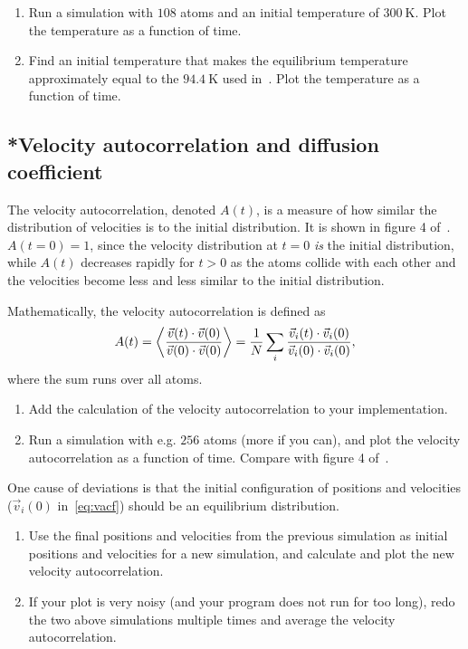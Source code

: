 \documentclass[11pt,english,a4paper]{report}
\begin{document}
\begin{enumerate}[label=\roman*.,resume]
    \item Run a simulation with \(108\) atoms and an initial temperature of \(\SI{300}{\kelvin}\). Plot the temperature as a function of time.
    \item Find an initial temperature that makes the equilibrium temperature approximately equal to the \(\SI{94.4}{\kelvin}\) used in~\cite{Rahman_1964}. Plot the temperature as a function of time.
\end{enumerate}


\subsection{*Velocity autocorrelation and diffusion coefficient}

The velocity autocorrelation, denoted \(A(t)\), is a measure of how
similar the distribution of velocities is to the initial
distribution. It is shown in figure 4
of~\cite{Rahman_1964}. \(A(t=0)=1\), since the velocity distribution
at \(t=0\) \emph{is} the initial distribution, while \(A(t)\)
decreases rapidly for \(t>0\) as the atoms collide with each other and
the velocities become less and less similar to the initial
distribution.

Mathematically, the velocity autocorrelation is defined as
\begin{equation}
    A(t) = \ev{\frac{\vec{v}(t)\cdot\vec{v}(0)}{\vec{v}(0)\cdot\vec{v}(0)}}
         = \frac{1}{N} \sum_i \frac{\vec{v}_i(t)\cdot\vec{v}_i(0)}{\vec{v}_i(0)\cdot\vec{v}_i(0)},\label{eq:vacf}
\end{equation}
where the sum runs over all atoms.

\begin{enumerate}[label=\roman*.]
    \item Add the calculation of the velocity autocorrelation to your implementation.
    \item Run a simulation with e.g. \(256\) atoms (more if you can), and plot the velocity autocorrelation as a function of time. Compare with figure 4 of~\cite{Rahman_1964}.
\end{enumerate}

One cause of deviations is that the initial configuration of positions
and velocities (\(\vec{v}_i(0)\) in~\vref{eq:vacf}) should be an
equilibrium distribution.

\begin{enumerate}[label=\roman*.,resume]
    \item Use the final positions and velocities from the previous simulation as initial positions and velocities for a new simulation, and calculate and plot the new velocity autocorrelation.
    \item If your plot is very noisy (and your program does not run for too long), redo the two above simulations multiple times and average the velocity autocorrelation.
\end{enumerate}
\end{document}
